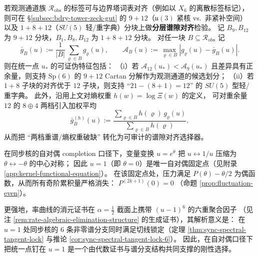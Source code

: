 \begin{remark}\label{rem:spec-gap-block-selector}
若观测通道族 \(\mathcal{R}_{\mathrm{obs}}\) 的标签可与边界塔词表对齐（例如以 \(X_6\) 的离散标签标记），
则可在 \S\ref{subsec:bdry-tower-zeck-gut} 的 \(9+12\)（\(\mathfrak{u}(3)\) 紧核 vs.\ 非紧补空间）
以及 \(1+8+12\)（\(SU(5)\) 轻/重字典）分块上做\textbf{分层谱隙对齐}检验。
记 \(B_9,B_{12}\) 为 \(9+12\) 分块，\(B_1,B_8,B_{12}\) 为 \(1+8+12\) 分块。
对任一块 \(B\subseteq \mathcal{R}_{\mathrm{obs}}\) 记
\[
\bar g_B(u):=\frac{1}{|B|}\sum_{\varrho\in B} g_{\varrho}(u),\qquad
\mathcal{A}_B(u):=\max_{\varrho\in B}\left|g_{\varrho}(u)-\bar g_B(u)\right|.
\]
则在统一点 \(u_\ast\) 的可证伪特征包括：
（i）若 \(\mathcal{A}_{12}(u_\ast) < \mathcal{A}_{9}(u_\ast)\) 且差异具有正余量，则支持 \(\mathrm{Sp}(6)\) 的 \(9+12\) Cartan 分解作为观测通道的候选划分；
（ii）若 \(1+8\) 子块的对齐优于 \(12\) 子块，则支持 “\(21-(8+1)=12\)” 的 \(SU(5)\) 型轻/重字典。
此外，沿用上文对熵权重 \(h(w)=\log\Xi(w)\) 的定义，
可对重余量 \(12\) 的 \(8\oplus 4\) 两档引入加权平均
\[
\bar g_B^{(h)}(u):=\frac{\sum_{\varrho\in B} h(\varrho)\,g_{\varrho}(u)}{\sum_{\varrho\in B} h(\varrho)},
\]
从而把 “两档重谱/熵权重破缺” 转化为可审计的谱隙对齐选择器。
\end{remark}

\begin{remark}[自对偶点 \(u=1\) 的对称固定性与六分支锁定]\label{rem:selfdual-u1-six-branch-lock}
在同步核的自对偶 completion 口径下，变量变换 \(u=e^{\theta}\) 把 \(u\leftrightarrow 1/u\) 压缩为 \(\theta\leftrightarrow -\theta\) 的中心对称；
因此 \(u=1\)（即 \(\theta=0\)）是唯一自对偶固定点（见附录 \ref{app:kernel-functional-equation}）。
在该固定点处，压力满足 \(P(\theta)-\theta/2\) 为偶函数，从而所有奇阶累积量严格消失：
\(
P^{(2k+1)}(0)=0
\)
（命题 \ref{prop:fluctuation-even}）。
\par
更强地，率曲线的消元证书在 \(\alpha=\tfrac12\) 截面上携带 \((u-1)^6\) 的六重聚合因子
（见注 \ref{rem:rate-algebraic-elimination-structure} 的生成证书），其解析意义是：
在 \(u=1\) 处同步核的 \(6\) 条非零谱分支同时满足切线锁定（定理 \ref{thm:sync-spectral-tangent-lock} 与推论 \ref{cor:sync-spectral-tangent-lock-6}）。
因此，在自对偶口径下把统一点钉在 \(u=1\) 是一个由代数证书与谱分支结构共同支撑的刚性选择。
\end{remark}

